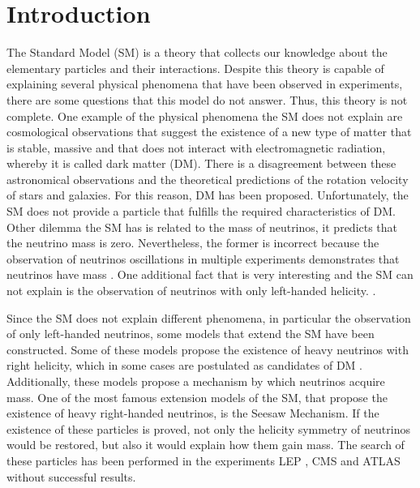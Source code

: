 \chapter{Introduction}
\label{Introduction_chapter}


The Standard Model (SM) is a theory that collects our knowledge about the elementary particles and their interactions. Despite this theory is capable of explaining several physical phenomena that have been observed in experiments, there are some questions that this model do not answer. Thus, this theory is not complete. One example of the physical phenomena the SM does not explain are cosmological observations that suggest the existence of a new type of matter that is stable, massive and that does not interact with electromagnetic radiation, whereby it is called dark matter (DM). There is a disagreement between these astronomical observations and the theoretical predictions of the rotation velocity of stars and galaxies. For this reason, DM has been proposed. Unfortunately, the SM does not provide a particle that fulfills the required characteristics of DM. Other dilemma the SM has is related to the mass of neutrinos, it predicts that the neutrino mass is zero. Nevertheless, the former is incorrect because the observation of neutrinos oscillations in multiple experiments demonstrates that neutrinos have mass \cite{Neutrino experiment 1 mass, Neutrino experiment 2 mass}. One additional fact that is very interesting and the SM can not explain is the observation of neutrinos with only left-handed helicity. . 

Since the SM does not explain different phenomena, in particular the observation of only left-handed neutrinos, some models that extend the SM have been constructed. Some of these models propose the existence of heavy neutrinos with right helicity, which in some cases are postulated as candidates of DM \cite{Neutrino dark matter candidate 1, Neutrino dark matter candidate 2}. Additionally, these models propose a mechanism by which neutrinos acquire mass. One of the most famous extension models of the SM, that propose the existence of heavy right-handed neutrinos, is the Seesaw Mechanism. If the existence of these particles is proved, not only the helicity symmetry of neutrinos would be restored, but also it would explain how them gain mass. The search of these particles has been performed in the experiments LEP \cite{Lep experiment}, CMS \cite{CMS experiment} and ATLAS \cite{ATLAS experiment} without successful results.

